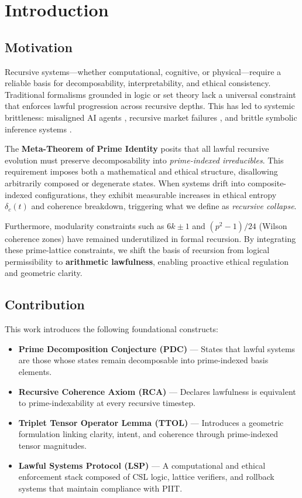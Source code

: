 \documentclass[12pt]{article}
\begin{document}
\newpage
\section{Introduction}

\subsection{Motivation}

Recursive systems—whether computational, cognitive, or physical—require a reliable basis for decomposability, interpretability, and ethical consistency. Traditional formalisms grounded in logic or set theory lack a universal constraint that enforces lawful progression across recursive depths. This has led to systemic brittleness: misaligned AI agents \cite{bostrom2014superintelligence}, recursive market failures \cite{sornette2003why}, and brittle symbolic inference systems \cite{godel1931formal}. 

The \textbf{Meta-Theorem of Prime Identity} posits that all lawful recursive evolution must preserve decomposability into \emph{prime-indexed irreducibles}. This requirement imposes both a mathematical and ethical structure, disallowing arbitrarily composed or degenerate states. When systems drift into composite-indexed configurations, they exhibit measurable increases in ethical entropy $\delta_c(t)$ and coherence breakdown, triggering what we define as \textit{recursive collapse}.

Furthermore, modularity constraints such as $6k \pm 1$ and $(p^2 - 1)/24$ (Wilson coherence zones) have remained underutilized in formal recursion. By integrating these prime-lattice constraints, we shift the basis of recursion from logical permissibility to \textbf{arithmetic lawfulness}, enabling proactive ethical regulation and geometric clarity.

\subsection{Contribution}

This work introduces the following foundational constructs:

\begin{itemize}
  \item \textbf{Prime Decomposition Conjecture (PDC)} — States that lawful systems are those whose states remain decomposable into prime-indexed basis elements.
  \item \textbf{Recursive Coherence Axiom (RCA)} — Declares lawfulness is equivalent to prime-indexability at every recursive timestep.
  \item \textbf{Triplet Tensor Operator Lemma (TTOL)} — Introduces a geometric formulation linking clarity, intent, and coherence through prime-indexed tensor magnitudes.
  \item \textbf{Lawful Systems Protocol (LSP)} — A computational and ethical enforcement stack composed of CSL logic, lattice verifiers, and rollback systems that maintain compliance with PIIT.
\end{itemize}
\end{document}
